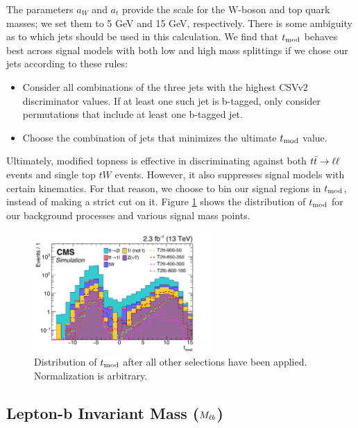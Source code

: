 The parameters $a_W$ and $a_t$ provide the scale for the W-boson
and top quark masses; we set them to 5 GeV and 15 GeV, respectively.
There is some ambiguity as to which jets should be used in this
calculation. We find that $t_\text{mod}$ behaves best across signal
models with both low and high mass splittings if we chose our jets
according to these rules:
\begin{itemize}
\item Consider all combinations of the three jets with the highest
  CSVv2 discriminator values. If at least one such jet is b-tagged,
  only consider permutations that include at least one b-tagged jet.
\item Choose the combination of jets that minimizes the ultimate
  $t_\text{mod}$ value.
\end{itemize}
Ultimately, modified topness is effective in discriminating against
both $t\bar{t} \rightarrow \ell\ell$ events and single top $tW$ events. However, it also
suppresses signal models with certain kinematics. For that reason, we
choose to bin our signal regions in $t_\text{mod}$, instead of making
a strict cut on it. Figure \ref{fig:stop:tmod} shows the distribution
of $t_\text{mod}$ for our background processes and various signal mass
points.

\begin{figure}
\centering
\includegraphics[width=0.6\textwidth]{figures/nminusone_tmod.pdf}
\caption{Distribution of $t_\text{mod}$ after all other selections
  have been applied. Normalization is arbitrary.}
\label{fig:stop:tmod}
\end{figure}

\subsection{Lepton-b Invariant Mass (\texorpdfstring{$M_{\ell b}$}{mlb})}
\label{ssec:stop:mlb}

